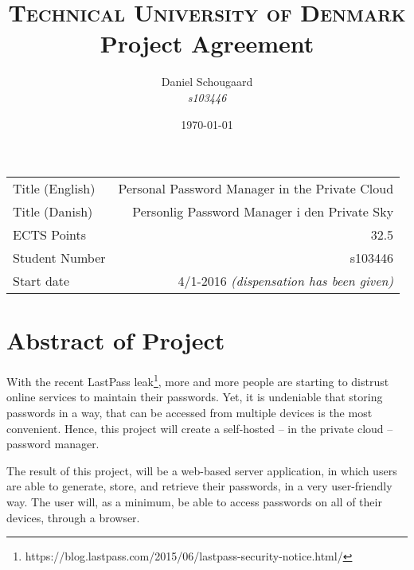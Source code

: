 \documentclass[a4paper,10pt]{article}
\title{	
\textsc{Technical University of Denmark} \\ [25pt] 
\huge Project Agreement
}
\author{Daniel Schougaard \\ \textit{s103446}}
\date{\normalsize\today}
\begin{document}
\maketitle 


\begin{tabular}{ | l | r | }
	Title (English)		&	Personal Password Manager in the Private Cloud			\\
	Title (Danish)		&	Personlig Password Manager i den Private Sky			\\
	ECTS Points			&	32.5													\\
	Student Number		&	s103446													\\
	Start date 			&	4/1-2016 \textit{(dispensation has been given)}			\\
\end{tabular}


\section{Abstract of Project}
	With the recent LastPass leak\footnote{https://blog.lastpass.com/2015/06/lastpass-security-notice.html/}, more and more people are starting to distrust online services to maintain their passwords. Yet, it is undeniable that storing passwords in a way, that can be accessed from multiple devices is the most convenient. Hence, this project will create a self-hosted -- in the private cloud -- password manager.


	The result of this project, will be a web-based server application, in which users are able to generate, store, and retrieve their passwords, in a very user-friendly way. The user will, as a minimum, be able to access passwords on all of their devices, through a browser.




\end{document}
